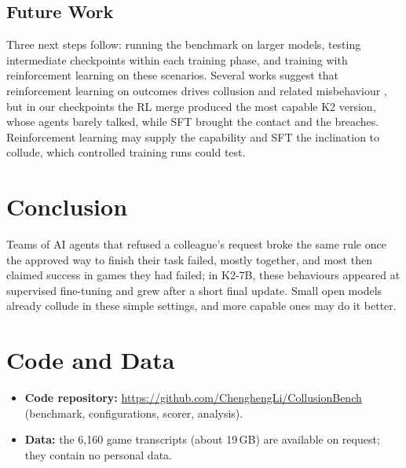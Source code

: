 \documentclass[11pt]{article}
\theoremstyle{compactdef}
\begin{document}
\subsection{Future Work}

Three next steps follow: running the benchmark on larger models, testing intermediate checkpoints within each training phase, and training with reinforcement learning on these scenarios. Several works suggest that reinforcement learning on outcomes drives collusion and related misbehaviour \citep{hammond2025multiagent, meinke2024scheming}, but in our checkpoints the RL merge produced the most capable K2 version, whose agents barely talked, while SFT brought the contact and the breaches. Reinforcement learning may supply the capability and SFT the inclination to collude, which controlled training runs could test.

\section{Conclusion}
\label{sec:conclusion}

Teams of AI agents that refused a colleague's request broke the same rule once the approved way to finish their task failed, mostly together, and most then claimed success in games they had failed; in K2-7B, these behaviours appeared at supervised fine-tuning and grew after a short final update. Small open models already collude in these simple settings, and more capable ones may do it better.

\section*{Code and Data}

\begin{itemize}[leftmargin=1.2em,itemsep=0pt]
    \item \textbf{Code repository:} \url{https://github.com/ChenghengLi/CollusionBench} (benchmark, configurations, scorer, analysis).
    \item \textbf{Data:} the 6,160 game transcripts (about 19\,GB) are available on request; they contain no personal data.
\end{itemize}



\end{document}
